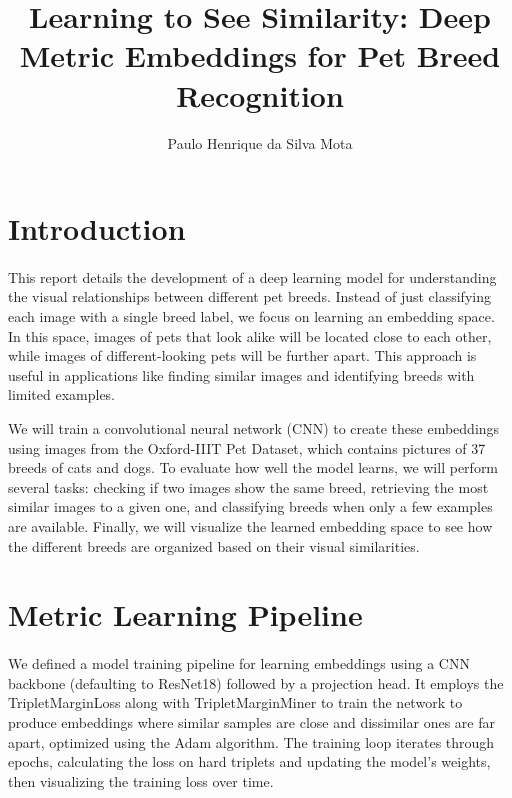 \documentclass{CUP-JNL-DTM}
\theoremstyle{definition}
\numberwithin{equation}{section}
\begin{document}
\begin{Frontmatter}

\title[Article Title]{Learning to See Similarity: Deep Metric Embeddings for Pet Breed Recognition
}

\author[1]{Paulo Henrique da Silva Mota}

\address[1]{, , . }


\end{Frontmatter}

\section{Introduction}
\paragraph{}This report details the development of a deep learning model for understanding the visual relationships between different pet breeds. Instead of just classifying each image with a single breed label, we focus on learning an embedding space. In this space, images of pets that look alike will be located close to each other, while images of different-looking pets will be further apart. This approach is useful in applications like finding similar images and identifying breeds with limited examples.

We will train a convolutional neural network (CNN) to create these embeddings using images from the Oxford-IIIT Pet Dataset, which contains pictures of 37 breeds of cats and dogs. To evaluate how well the model learns, we will perform several tasks: checking if two images show the same breed, retrieving the most similar images to a given one, and classifying breeds when only a few examples are available. Finally, we will visualize the learned embedding space to see how the different breeds are organized based on their visual similarities.

\section{Metric Learning Pipeline}

\paragraph{}We defined a model training pipeline for learning embeddings using a CNN backbone (defaulting to ResNet18) followed by a projection head. It employs the TripletMarginLoss along with TripletMarginMiner to train the network to produce embeddings where similar samples are close and dissimilar ones are far apart, optimized using the Adam algorithm. The training loop iterates through epochs, calculating the loss on hard triplets and updating the model's weights, then visualizing the training loss over time.
\end{document}
